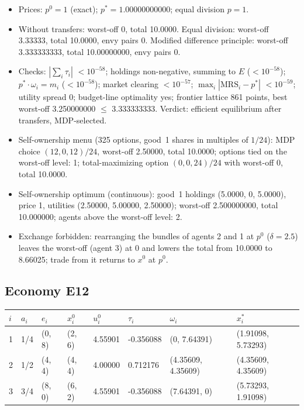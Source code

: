 \begin{itemize}[leftmargin=1.2em,itemsep=0pt,topsep=2pt]\footnotesize
\item Prices: $p^0 = 1$ (exact); $p^* = 1.00000000000$; equal division $p = 1$.
\item Without transfers: worst-off 0, total 10.0000. Equal division: worst-off 3.33333, total 10.0000, envy pairs 0. Modified difference principle: worst-off 3.333333333, total 10.00000000, envy pairs 0.
\item Checks: $|\sum_i\tau_i|$ $<10^{-58}$; holdings non-negative, summing to $E$ ($<10^{-58}$); $p^*\cdot\omega_i = m_i$ ($<10^{-58}$); market clearing $<10^{-57}$; $\max_i|\mathrm{MRS}_i - p^*|$ $<10^{-59}$; utility spread 0; budget-line optimality yes; frontier lattice 861 points, best worst-off 3.250000000 $\leq$ 3.333333333. Verdict: efficient equilibrium after transfers, MDP-selected.
\item Self-ownership menu (325 options, good~1 shares in multiples of $1/24$): MDP choice $(12, 0, 12)/24$, worst-off 2.50000, total 10.0000; options tied on the worst-off level: 1; total-maximizing option $(0, 0, 24)/24$ with worst-off 0, total 10.0000.
\item Self-ownership optimum (continuous): good~1 holdings (5.0000, 0, 5.0000), price 1, utilities (2.50000, 5.00000, 2.50000); worst-off 2.500000000, total 10.000000; agents above the worst-off level: 2.
\item Exchange forbidden: rearranging the bundles of agents 2 and 1 at $p^0$ ($\delta = 2.5$) leaves the worst-off (agent 3) at 0 and lowers the total from 10.0000 to 8.66025; trade from it returns to $x^0$ at $p^0$.
\end{itemize}

\subsection*{Economy E12}
\label{ec:E12}
{\scriptsize\setlength{\tabcolsep}{3pt}
\begin{tabular}{@{}llllllll@{}}
\toprule
$i$ & $a_i$ & $e_i$ & $x^0_i$ & $u^0_i$ & $\tau_i$ & $\omega_i$ & $x^*_i$ \\
\midrule
1 & 1/4 & (0, 8) & (2, 6) & 4.55901 & -0.356088 & (0, 7.64391) & (1.91098, 5.73293) \\
2 & 1/2 & (4, 4) & (4, 4) & 4.00000 & 0.712176 & (4.35609, 4.35609) & (4.35609, 4.35609) \\
3 & 3/4 & (8, 0) & (6, 2) & 4.55901 & -0.356088 & (7.64391, 0) & (5.73293, 1.91098) \\
\bottomrule\end{tabular}}

